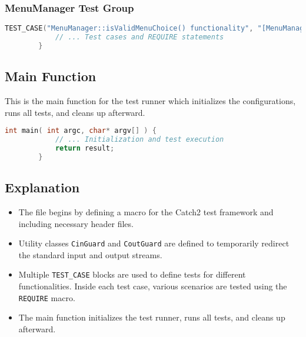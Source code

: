 \documentclass{article}
\begin{document}
	
	\subsubsection*{MenuManager Test Group}
	\begin{mdframed}[backgroundcolor=background, hidealllines=false, innerleftmargin=15pt, innerrightmargin=5pt, innertopmargin=-5pt, innerbottommargin=-7pt]
	\begin{lstlisting}[language=C++]
		TEST_CASE("MenuManager::isValidMenuChoice() functionality", "[MenuManager]") {
			// ... Test cases and REQUIRE statements
		}
	\end{lstlisting}
	\end{mdframed}
	
	
	\subsection*{Main Function}
	This is the main function for the test runner which initializes the configurations, runs all tests, and cleans up afterward.

	\begin{mdframed}[backgroundcolor=background, hidealllines=false, innerleftmargin=15pt, innerrightmargin=5pt, innertopmargin=-5pt, innerbottommargin=-7pt]
	\begin{lstlisting}[language=C++]
		int main( int argc, char* argv[] ) {
			// ... Initialization and test execution
			return result;
		}
	\end{lstlisting}
\end{mdframed}
	
	\subsection*{Explanation}
	\begin{itemize}
		\item The file begins by defining a macro for the Catch2 test framework and including necessary header files.
		\item Utility classes \texttt{CinGuard} and \texttt{CoutGuard} are defined to temporarily redirect the standard input and output streams.
		\item Multiple \texttt{TEST\_CASE} blocks are used to define tests for different functionalities. Inside each test case, various scenarios are tested using the \texttt{REQUIRE} macro.
		\item The main function initializes the test runner, runs all tests, and cleans up afterward.
	\end{itemize}
	
\end{document}
